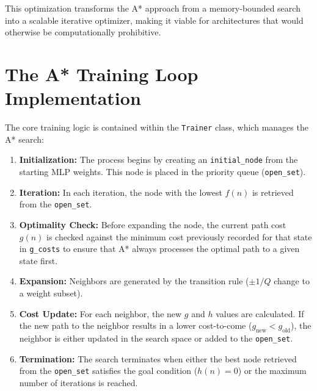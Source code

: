 This optimization transforms the A* approach from a memory-bounded search into a scalable iterative optimizer, making it viable for architectures that would otherwise be computationally prohibitive.


\section{The A* Training Loop Implementation}

The core training logic is contained within the \texttt{Trainer} class, which manages the A* search:
\begin{enumerate}
    \item \textbf{Initialization:} The process begins by creating an \texttt{initial\_node} from the starting MLP weights. This node is placed in the priority queue (\texttt{open\_set}).
    \item \textbf{Iteration:} In each iteration, the node with the lowest $f(n)$ is retrieved from the \texttt{open\_set}.
    \item \textbf{Optimality Check:} Before expanding the node, the current path cost $g(n)$ is checked against the minimum cost previously recorded for that state in \texttt{g\_costs} to ensure that A* always processes the optimal path to a given state first.
    \item \textbf{Expansion:} Neighbors are generated by the transition rule ($\pm 1/Q$ change to a weight subset).
    \item \textbf{Cost Update:} For each neighbor, the new $g$ and $h$ values are calculated. If the new path to the neighbor results in a lower cost-to-come ($g_{\text{new}} < g_{\text{old}}$), the neighbor is either updated in the search space or added to the \texttt{open\_set}.
    \item \textbf{Termination:} The search terminates when either the best node retrieved from the \texttt{open\_set} satisfies the goal condition ($h(n) = 0$) or the maximum number of iterations is reached.
\end{enumerate}




